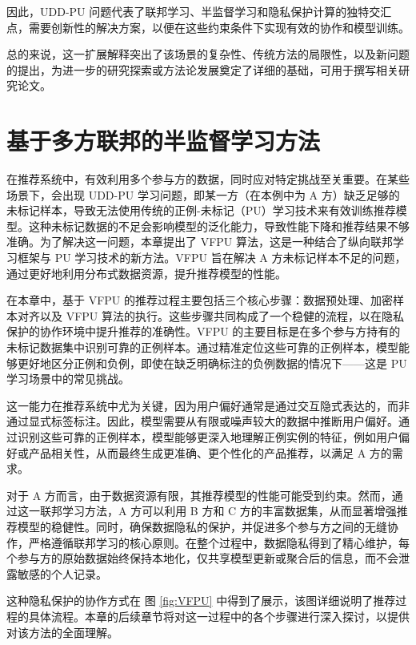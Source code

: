 因此，UDD-PU 问题代表了联邦学习、半监督学习和隐私保护计算的独特交汇点，需要创新性的解决方案，以便在这些约束条件下实现有效的协作和模型训练。

总的来说，这一扩展解释突出了该场景的复杂性、传统方法的局限性，以及新问题的提出，为进一步的研究探索或方法论发展奠定了详细的基础，可用于撰写相关研究论文。


\section{基于多方联邦的半监督学习方法}
在推荐系统中，有效利用多个参与方的数据，同时应对特定挑战至关重要。在某些场景下，会出现 UDD-PU 学习问题，即某一方（在本例中为 A 方）缺乏足够的未标记样本，导致无法使用传统的正例-未标记（PU）学习技术来有效训练推荐模型。这种未标记数据的不足会影响模型的泛化能力，导致性能下降和推荐结果不够准确。为了解决这一问题，本章提出了 VFPU 算法，这是一种结合了纵向联邦学习框架与 PU 学习技术的新方法。VFPU 旨在解决 A 方未标记样本不足的问题，通过更好地利用分布式数据资源，提升推荐模型的性能。

在本章中，基于 VFPU 的推荐过程主要包括三个核心步骤：数据预处理、加密样本对齐以及 VFPU 算法的执行。这些步骤共同构成了一个稳健的流程，以在隐私保护的协作环境中提升推荐的准确性。VFPU 的主要目标是在多个参与方持有的未标记数据集中识别可靠的正例样本。通过精准定位这些可靠的正例样本，模型能够更好地区分正例和负例，即使在缺乏明确标注的负例数据的情况下——这是 PU 学习场景中的常见挑战。

这一能力在推荐系统中尤为关键，因为用户偏好通常是通过交互隐式表达的，而非通过显式标签标注。因此，模型需要从有限或噪声较大的数据中推断用户偏好。通过识别这些可靠的正例样本，模型能够更深入地理解正例实例的特征，例如用户偏好或产品相关性，从而最终生成更准确、更个性化的产品推荐，以满足 A 方的需求。

对于 A 方而言，由于数据资源有限，其推荐模型的性能可能受到约束。然而，通过这一联邦学习方法，A 方可以利用 B 方和 C 方的丰富数据集，从而显著增强推荐模型的稳健性。同时，确保数据隐私的保护，并促进多个参与方之间的无缝协作，严格遵循联邦学习的核心原则。在整个过程中，数据隐私得到了精心维护，每个参与方的原始数据始终保持本地化，仅共享模型更新或聚合后的信息，而不会泄露敏感的个人记录。

这种隐私保护的协作方式在 图 \ref{fig:VFPU} 中得到了展示，该图详细说明了推荐过程的具体流程。本章的后续章节将对这一过程中的各个步骤进行深入探讨，以提供对该方法的全面理解。


